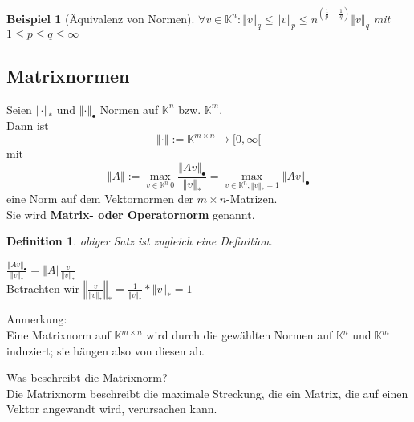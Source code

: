 \documentclass[a4paper,10pt]{article}
\newcommand{\norm}[1]{ \left\Vert #1 \right\Vert }
\newtheorem[L]{satz}{Satz}[section]
\newtheorem{definition}{Definition}[section]
\newtheorem{bsp}{Beispiel}[section]
\newtheorem[S]{beweis}{Beweis}
\newtheorem[S]{beh}{Behauptung}
\begin{document}
\begin{bsp}[Äquivalenz von Normen]
$\forall v \in \mathbb{K}^n:
\norm{v}_q \leq \norm{v}_p \leq n^{(\frac{1}{p} - \frac{1}{q})} \norm{v}_q$ mit 
$1 \leq p \leq q \leq \infty$
\end{bsp}


\subsection{Matrixnormen}
\begin{satz}[Matrixnorm]
Seien $\norm{\cdot}_* $ und $ \norm{\cdot}_\bullet $ Normen auf $\mathbb{K}^n$ bzw. $\mathbb{K}^m$.\\
Dann ist $$ \norm{\cdot} := \mathbb{K}^{ m \times n} \rightarrow [0, \infty [ $$ mit
                                                                                                                                                                     $$\norm{A} := \max \limits_{v \in \mathbb{K}^n \ {0}} { \frac{\norm{Av}_\bullet}{\norm{v}_*}} = \max\limits_{v \in \mathbb{K}^n, \norm{v}_* = 1} { {\norm{Av}_\bullet}}$$
eine Norm auf dem Vektornormen der $m \times n$-Matrizen.\\
Sie wird \textbf{Matrix- oder Operatornorm} genannt.
\end{satz}

\begin{definition}
 obiger Satz ist zugleich eine Definition.
\end{definition}

\smallskip

\begin{beweis}
$\frac{\norm{Av}_\bullet}{\norm{v}_*} = \norm{A} \frac{v}{\norm{v}_*}$\\
Betrachten wir $\norm{\frac{v}{\norm{v}_*}}_* = \frac{1}{\norm{v}_*} * \norm{v}_* = 1$
\end{beweis}

\smallskip

Anmerkung:\\
Eine Matrixnorm auf $\mathbb{K}^{m 
\times n}$ wird durch die gewählten Normen auf $\mathbb{K}^n$ und $\mathbb{K}^m$ induziert; sie hängen also von diesen ab.\\

\smallskip

Was beschreibt die Matrixnorm?\\
Die Matrixnorm beschreibt die maximale Streckung, die ein Matrix, die auf einen Vektor angewandt wird, verursachen kann.
\end{document}
